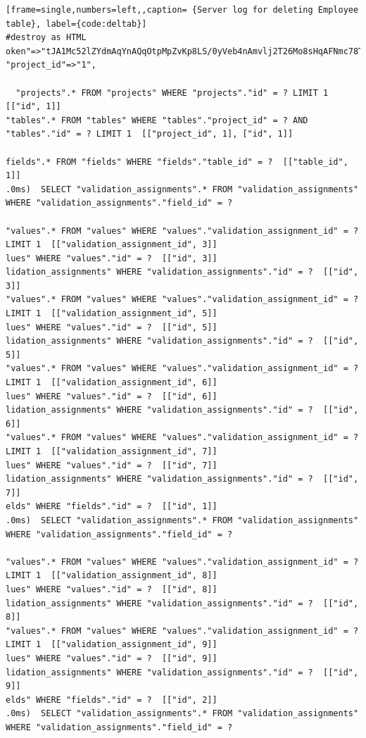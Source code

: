 \documentclass[a4paper,12pt]{article}
\begin{document}
\appendix
\begin{lstlisting}[frame=single,numbers=left,,caption= {Server log for deleting Employee table}, label={code:deltab}]
#destroy as HTML
oken"=>"tJA1Mc52lZYdmAqYnAQqOtpMpZvKp8LS/0yVeb4nAmvlj2T26Mo8sHqAFNmc78TPNEwDB0ET4xY5fDeddcrKsg==", "project_id"=>"1",

  "projects".* FROM "projects" WHERE "projects"."id" = ? LIMIT 1  [["id", 1]]
"tables".* FROM "tables" WHERE "tables"."project_id" = ? AND "tables"."id" = ? LIMIT 1  [["project_id", 1], ["id", 1]]

fields".* FROM "fields" WHERE "fields"."table_id" = ?  [["table_id", 1]]
.0ms)  SELECT "validation_assignments".* FROM "validation_assignments" WHERE "validation_assignments"."field_id" = ?

"values".* FROM "values" WHERE "values"."validation_assignment_id" = ? LIMIT 1  [["validation_assignment_id", 3]]
lues" WHERE "values"."id" = ?  [["id", 3]]
lidation_assignments" WHERE "validation_assignments"."id" = ?  [["id", 3]]
"values".* FROM "values" WHERE "values"."validation_assignment_id" = ? LIMIT 1  [["validation_assignment_id", 5]]
lues" WHERE "values"."id" = ?  [["id", 5]]
lidation_assignments" WHERE "validation_assignments"."id" = ?  [["id", 5]]
"values".* FROM "values" WHERE "values"."validation_assignment_id" = ? LIMIT 1  [["validation_assignment_id", 6]]
lues" WHERE "values"."id" = ?  [["id", 6]]
lidation_assignments" WHERE "validation_assignments"."id" = ?  [["id", 6]]
"values".* FROM "values" WHERE "values"."validation_assignment_id" = ? LIMIT 1  [["validation_assignment_id", 7]]
lues" WHERE "values"."id" = ?  [["id", 7]]
lidation_assignments" WHERE "validation_assignments"."id" = ?  [["id", 7]]
elds" WHERE "fields"."id" = ?  [["id", 1]]
.0ms)  SELECT "validation_assignments".* FROM "validation_assignments" WHERE "validation_assignments"."field_id" = ?

"values".* FROM "values" WHERE "values"."validation_assignment_id" = ? LIMIT 1  [["validation_assignment_id", 8]]
lues" WHERE "values"."id" = ?  [["id", 8]]
lidation_assignments" WHERE "validation_assignments"."id" = ?  [["id", 8]]
"values".* FROM "values" WHERE "values"."validation_assignment_id" = ? LIMIT 1  [["validation_assignment_id", 9]]
lues" WHERE "values"."id" = ?  [["id", 9]]
lidation_assignments" WHERE "validation_assignments"."id" = ?  [["id", 9]]
elds" WHERE "fields"."id" = ?  [["id", 2]]
.0ms)  SELECT "validation_assignments".* FROM "validation_assignments" WHERE "validation_assignments"."field_id" = ?


\end{lstlisting}
\end{document}
